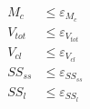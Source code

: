 \begin{align*}
	M_c &\leq ε_{M_c} \\
	V_{tot} &\leq ε_{V_{tot}}\\
	V_{cl} &\leq ε_{V_{cl}}\\
	SS_{ss} &\leq ε_{SS_{ss}}\\
	SS_{l} &\leq ε_{SS_{l}}
\end{align*}



% 

%
%	
%    

